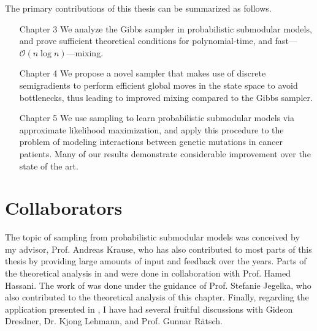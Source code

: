 The primary contributions of this thesis can be summarized as follows.
\begin{itemize}[leftmargin=3.5em]
\item[\textsf{Chapter 3}] We analyze the Gibbs sampler in probabilistic submodular models, and prove sufficient theoretical conditions for polynomial-time, and fast---$\mathcal{O}(n\log n)$---mixing.
\item[\textsf{Chapter 4}] We propose a novel sampler that makes use of discrete semigradients to perform efficient global moves in the state space to avoid bottlenecks, thus leading to improved mixing compared to the Gibbs sampler.
\item[\textsf{Chapter 5}] We use sampling to learn probabilistic submodular models via approximate likelihood maximization, and apply this procedure to the problem of modeling interactions between genetic mutations in cancer patients.
Many of our results demonstrate considerable improvement over the state of the art.
\end{itemize}

\section{Collaborators}
The topic of sampling from probabilistic submodular models was conceived by my advisor, Prof. Andreas Krause, who has also contributed to most parts of this thesis by providing large amounts of input and feedback over the years.
Parts of the theoretical analysis in  and  were done in collaboration with Prof. Hamed Hassani.
The work of  was done under the guidance of Prof. Stefanie Jegelka, who also contributed to the theoretical analysis of this chapter.
Finally, regarding the application presented in , I have had several fruitful discussions with Gideon Dresdner, Dr. Kjong Lehmann, and Prof. Gunnar Rätsch.